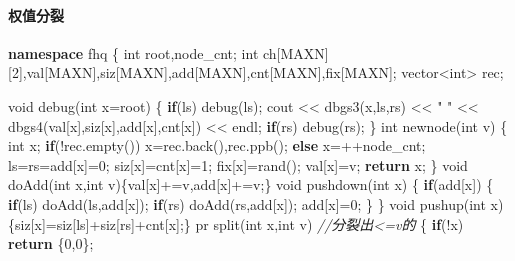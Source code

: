 \documentclass[
]{article}
\newenvironment{Shaded}{}{}
\newcommand{\CommentTok}[1]{\textcolor[rgb]{0.38,0.63,0.69}{\textit{#1}}}
\newcommand{\ControlFlowTok}[1]{\textcolor[rgb]{0.00,0.44,0.13}{\textbf{#1}}}
\newcommand{\DataTypeTok}[1]{\textcolor[rgb]{0.56,0.13,0.00}{#1}}
\newcommand{\DecValTok}[1]{\textcolor[rgb]{0.25,0.63,0.44}{#1}}
\newcommand{\KeywordTok}[1]{\textcolor[rgb]{0.00,0.44,0.13}{\textbf{#1}}}
\newcommand{\NormalTok}[1]{#1}
\newcommand{\StringTok}[1]{\textcolor[rgb]{0.25,0.44,0.63}{#1}}
\begin{document}
\hypertarget{ux6743ux503cux5206ux88c2}{%
\paragraph{权值分裂}\label{ux6743ux503cux5206ux88c2}}

\begin{Shaded}
\begin{Highlighting}[]
\KeywordTok{namespace}\NormalTok{ fhq}
\NormalTok{\{}
    \DataTypeTok{int}\NormalTok{ root,node\_cnt;}
    \DataTypeTok{int}\NormalTok{ ch[MAXN][}\DecValTok{2}\NormalTok{],val[MAXN],siz[MAXN],add[MAXN],cnt[MAXN],fix[MAXN];}
\NormalTok{    vector\textless{}}\DataTypeTok{int}\NormalTok{\textgreater{} rec;}

    \DataTypeTok{void}\NormalTok{ debug(}\DataTypeTok{int}\NormalTok{ x=root)}
\NormalTok{    \{}
        \ControlFlowTok{if}\NormalTok{(ls) debug(ls);}
\NormalTok{        cout \textless{}\textless{} dbgs3(x,ls,rs) \textless{}\textless{} }\StringTok{" "}\NormalTok{ \textless{}\textless{} dbgs4(val[x],siz[x],add[x],cnt[x]) \textless{}\textless{} endl;}
        \ControlFlowTok{if}\NormalTok{(rs) debug(rs);}
\NormalTok{    \}}
    \DataTypeTok{int}\NormalTok{ newnode(}\DataTypeTok{int}\NormalTok{ v)}
\NormalTok{    \{}
        \DataTypeTok{int}\NormalTok{ x;}
        \ControlFlowTok{if}\NormalTok{(!rec.empty()) x=rec.back(),rec.ppb();}
        \ControlFlowTok{else}\NormalTok{ x=++node\_cnt;}
\NormalTok{        ls=rs=add[x]=}\DecValTok{0}\NormalTok{;}
\NormalTok{        siz[x]=cnt[x]=}\DecValTok{1}\NormalTok{;}
\NormalTok{        fix[x]=rand();}
\NormalTok{        val[x]=v;}
        \ControlFlowTok{return}\NormalTok{ x;}
\NormalTok{    \}}
    \DataTypeTok{void}\NormalTok{ doAdd(}\DataTypeTok{int}\NormalTok{ x,}\DataTypeTok{int}\NormalTok{ v)\{val[x]+=v,add[x]+=v;\}}
    \DataTypeTok{void}\NormalTok{ pushdown(}\DataTypeTok{int}\NormalTok{ x)}
\NormalTok{    \{}
        \ControlFlowTok{if}\NormalTok{(add[x])}
\NormalTok{        \{}
            \ControlFlowTok{if}\NormalTok{(ls) doAdd(ls,add[x]);}
            \ControlFlowTok{if}\NormalTok{(rs) doAdd(rs,add[x]);}
\NormalTok{            add[x]=}\DecValTok{0}\NormalTok{;}
\NormalTok{        \}}
\NormalTok{    \}}
    \DataTypeTok{void}\NormalTok{ pushup(}\DataTypeTok{int}\NormalTok{ x)\{siz[x]=siz[ls]+siz[rs]+cnt[x];\}}
\NormalTok{    pr split(}\DataTypeTok{int}\NormalTok{ x,}\DataTypeTok{int}\NormalTok{ v) }\CommentTok{//分裂出\textless{}=v的}
\NormalTok{    \{}
        \ControlFlowTok{if}\NormalTok{(!x) }\ControlFlowTok{return}\NormalTok{ \{}\DecValTok{0}\NormalTok{,}\DecValTok{0}\NormalTok{\};}

\end{Highlighting}
\end{Shaded}
\end{document}
